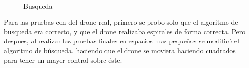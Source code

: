 \begin{figure}[H]
 \centering
	\\
 \caption{Busqueda}
 \label{f:Busqueda sobre el simulador}
\end{figure}


\hspace{1cm} Para las pruebas con del drone real, primero se probo solo que el algoritmo de busqueda era correcto, y que el drone realizaba espirales de forma correcta. Pero despues, al realizar las pruebas finales en espacios mas pequeños se modific\'o el algoritmo de b\'usqueda, haciendo que el drone se moviera haciendo cuadrados para tener un mayor control sobre \'este. 

